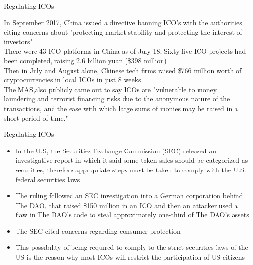 \documentclass[9pt]{beamer}
\begin{document}
\begin{frame}{Regulating ICOs}
	\begin{small}
		In September 2017, China issued a directive banning ICO's with the authorities citing concerns about "protecting market stability and protecting the interest of investors"\\ \vspace{3mm}
		There were 43 ICO platforms in China as of July 18; Sixty-five ICO projects had been completed, raising 2.6 billion yuan (\$398 million) \\ \vspace{3mm}
		Then in July and August alone, Chinese tech firms raised \$766 million worth of cryptocurrencies in local ICOs in just 8 weeks \\ \vspace{3mm}
		The MAS,also publicly came out to say ICOs are "vulnerable to money laundering and terrorist financing risks due to the anonymous nature of the transactions, and the ease with which large sums of monies may be raised in a short period of time."\\ \vspace{3mm}
	\end{small}
\end{frame}


\begin{frame}{Regulating ICOs}
	\begin{itemize}
		\item In the U.S, the Securities Exchange Commission (SEC) released an investigative report in which it said some token sales should be categorized as securities, therefore appropriate steps must be taken to comply with the U.S. federal securities laws
		\item The ruling followed an SEC investigation into a German corporation behind The DAO, that raised \$150 million in an ICO and then an attacker used a flaw in The DAO's code to steal approximately one-third of The DAO's assets
		\item The SEC cited concerns regarding consumer protection
		\item This possibility of being required to comply to the strict securities laws of the US is the reason why most ICOs will restrict the participation of US citizens
	\end{itemize}
\end{frame}
\end{document}
